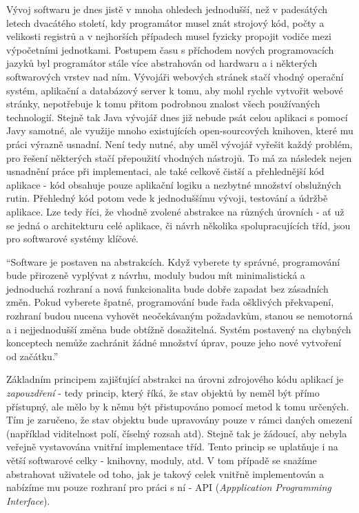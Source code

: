 Vývoj softwaru je dnes jistě v mnoha ohledech jednodušší, než v padesátých letech dvacátého století, kdy programátor musel znát strojový kód, počty a velikosti registrů a v nejhorších případech musel fyzicky propojit vodiče mezi výpočetními jednotkami. Postupem času s příchodem nových programovacích jazyků byl programátor stále více abstrahován od hardwaru a i některých softwarových vrstev nad ním. Vývojáři webových stránek stačí vhodný operační systém, aplikační a databázový server k tomu, aby mohl rychle vytvořit webové stránky, nepotřebuje k tomu přitom podrobnou znalost všech používaných technologií. Stejně tak Java vývojář dnes již nebude psát celou aplikaci s pomocí Javy samotné, ale využije mnoho existujících open-sourcových knihoven, které mu práci výrazně usnadní. Není tedy nutné, aby uměl vývojář vyřešit každý problém, pro řešení některých stačí přepoužití vhodných nástrojů. To má za následek nejen usnadnění práce při implementaci, ale také celkově čistší a přehlednější kód aplikace - kód obsahuje pouze aplikační logiku a nezbytné množství obslužných rutin. Přehledný kód potom vede k jednoduššímu vývoji, testování a údržbě aplikace. Lze tedy říci, že vhodně zvolené abstrakce na různých úrovních - ať už se jedná o architekturu celé aplikace, či návrh několika spolupracujících tříd, jsou pro softwarové systémy klíčové. 

 ``Software je postaven na abstrakcích. Když vyberete ty správné, programování bude přirozeně vyplývat z návrhu, moduly budou mít minimalistická a jednoduchá rozhraní a nová funkcionalita bude dobře zapadat bez zásadních změn. Pokud vyberete špatné, programování bude řada ošklivých překvapení, rozhraní budou nucena vyhovět neočekávaným požadavkům, stanou se nemotorná a i nejjednodušší změna bude obtížně dosažitelná. Systém postavený na chybných konceptech nemůže zachránit žádné množství úprav, pouze jeho nové vytvoření od začátku.'' \cite{Jackson06}  

Základním principem zajišťující abstrakci na úrovni zdrojového kódu aplikací je \textit{zapouzdření} - tedy princip, který říká, že stav objektů by neměl být přímo přístupný, ale mělo by k němu být přistupováno pomocí metod k tomu určených. Tím je zaručeno, že stav objektu bude upravovány pouze v rámci daných omezení (například viditelnost polí, číselný rozsah atd). Stejně tak je žádoucí, aby nebyla veřejně vystavována vnitřní implementace tříd. Tento princip se uplatňuje i na větší softwarové celky - knihovny, moduly, atd. V tom případě se snažíme abstrahovat uživatele od toho, jak je takový celek vnitřně implementován a nabízíme mu pouze rozhraní pro práci s ní - API (\textit{Appplication Programming Interface}). 

